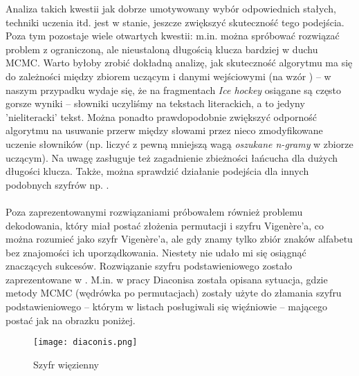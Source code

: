 \documentclass[a4paper]{article}
\theoremstyle{defn}
\theoremstyle{theorem}
\theoremstyle{lemma}
\theoremstyle{cor}
\theoremstyle{fact}
\begin{document}
Analiza takich kwestii jak dobrze umotywowany wybór odpowiednich stałych, techniki uczenia itd. jest w stanie, jeszcze zwiększyć skuteczność tego podejścia. Poza tym pozostaje wiele otwartych kwestii: m.in. można spróbować rozwiązać problem z ograniczoną, ale nieustaloną długością klucza bardziej w duchu MCMC. Warto byłoby zrobić dokładną analizę, jak skuteczność algorytmu ma się do zależności między zbiorem uczącym i danymi wejściowymi (na wzór \cite{Connor}) – w naszym przypadku wydaje się, że na fragmentach \textit{Ice hockey} osiągane są często gorsze wyniki – słowniki uczyliśmy na tekstach literackich, a to jedyny 'nieliteracki' tekst. Można ponadto prawdopodobnie zwiększyć odporność algorytmu na usuwanie przerw między słowami przez nieco zmodyfikowane uczenie słowników (np. liczyć z pewną mniejszą wagą \textit{oszukane n-gramy} w zbiorze uczącym). Na uwagę zasługuje też zagadnienie zbieżności łańcucha dla dużych długości klucza. Także, można sprawdzić działanie podejścia dla innych podobnych szyfrów np. \cite{enhanced}.
\\\\
Poza zaprezentowanymi rozwiązaniami próbowałem również problemu dekodowania, który miał postać złożenia permutacji i szyfru Vigenère'a, co można rozumieć jako szyfr Vigenère'a, ale gdy znamy tylko zbiór znaków alfabetu bez znajomości ich uporządkowania. Niestety nie udało mi się osiągnąć znaczących sukcesów. Rozwiązanie szyfru podstawieniowego zostało zaprezentowane w \cite{Connor} \cite{Diaconis} \cite{Chen&Rosenthal}. M.in. w pracy Diaconisa została opisana sytuacja, gdzie metody MCMC (wędrówka po permutacjach) zostały użyte do złamania szyfru podstawieniowego – którym w listach posługiwali się więźniowie – mającego postać jak na obrazku poniżej.\\

\begin{figure}[h]
\centering
\texttt{[image: diaconis.png]}
\caption{Szyfr więzienny}
\end{figure}
\end{document}
